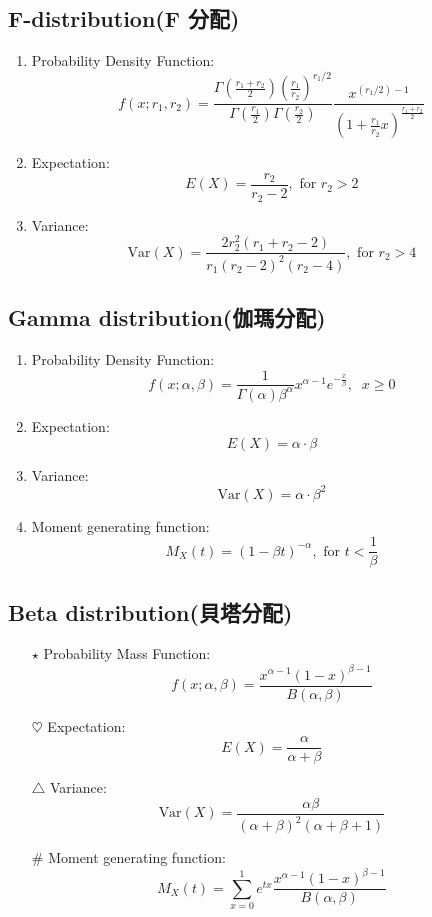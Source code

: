 \documentclass[12pt, a4paper]{article}
\begin{document}
\subsection{F-distribution(F 分配)}
\begin{enumerate}[$\rightarrow$]
\item Probability Density Function:$$f(x;r_1,r_2)=\frac{\Gamma\left(\frac{r_1+r_2}{2}\right) \left(\frac{r_1}{r_2}\right)^{r_1/2}}{\Gamma\left(\frac{r_1}{2}\right)\Gamma\left(\frac{r_2}{2}\right)} \frac{x^{(r_1/2)-1}}{\left(1+\frac{r_1}{r_2}x\right)^{\frac{r_1+r_2}{2}}}$$
\item Expectation:$$E(X)=\frac{r_2}{r_2 - 2},\text{ for } r_2 > 2$$
\item Variance:$$\text{Var}(X) = \frac{2r_2^2 (r_1+r_2-2)}{r_1(r_2-2)^2(r_2-4)}, \text{ for } r_2 > 4$$
\end{enumerate}
\subsection{Gamma distribution(伽瑪分配)}
\begin{enumerate}[*]
\item Probability Density Function:$$f(x;\alpha,\beta)=\frac{1}{\Gamma(\alpha)\beta^\alpha}x^{\alpha-1}e^{-\frac{x}{\beta}}, \;\; x\geq 0$$
\item Expectation:$$E(X)=\alpha\cdot\beta$$
\item Variance:$$\text{Var}(X)=\alpha\cdot\beta^2$$
\item Moment generating function:$$M_X(t)=(1-\beta t)^{-\alpha}, \text{ for } t < \frac{1}{\beta}$$
\end{enumerate}
\subsection{Beta distribution(貝塔分配)}
\begin{enumerate}
\item[$\star$] Probability Mass Function:$$f(x; \alpha, \beta) = \frac{x^{\alpha-1}(1-x)^{\beta-1}}{B(\alpha, \beta)}$$
\item[$\heartsuit$] Expectation:$$E(X) = \frac{\alpha}{\alpha + \beta}$$
\item[$\triangle$] Variance:$$\text{Var}(X) = \frac{\alpha\beta}{(\alpha + \beta)^2(\alpha + \beta + 1)}$$
\item[$\#$] Moment generating function:$$M_X(t) = \sum_{x=0}^{1} e^{tx} \frac{x^{\alpha-1}(1-x)^{\beta-1}}{B(\alpha, \beta)}$$
\end{enumerate}
\end{document}
